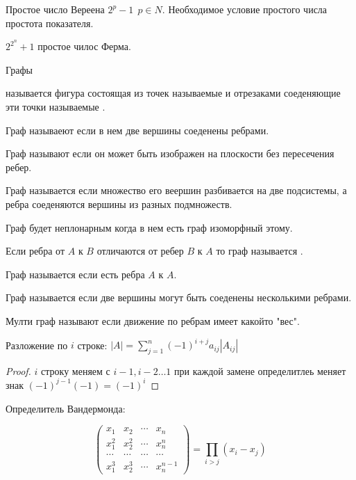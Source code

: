   Простое число Вереена $2^p -1 ~~ p \in N$. Необходимое условие простого числа
простота показателя.

  $2^{2^n} + 1$ простое чилос Ферма.

\begin{title}
  Графы
\end{title}
   называется фигура состоящая из точек называемые 
и отрезаками соеденяющие эти точки называемые .

  Граф называеют  если в нем две вершины соеденены ребрами.

  Граф называют  если он может быть
изображен на плоскости без пересечения ребер.

  Граф называется  если множество его веершин
разбивается на две подсистемы, а ребра соеденяются вершины из разных
подмножеств.

  Граф будет неплонарным когда в нем есть граф изоморфный этому.

  Если ребра от $A$ к $B$ отличаются от ребер $B$ к $A$ то граф называется
.

  Граф называется  если есть ребра $A$ к $A$.

  Граф называется  если две вершины могут быть соеденены
несколькими ребрами.

  Мулти граф называют  если движение по ребрам имеет
какойто "вес".

\begin{theorem}
  Разложение по $i$ строке: $|A| = \sum_{j=1}^n (-1)^{i+j} a_{ij} |A_{ij}|$
\end{theorem}

\begin{proof}
  $i$ строку меняем с $i-1, i-2 \ldots 1$ при каждой замене определитлеь
  меняет знак $(-1)^{j-1} (-1) = (-1)^i$
\end{proof}

\begin{title}
  Определитель Вандермонда:
\end{title}

\begin{displaymath}
  \left(
  \begin{array}{ccccl}
    x_1   & x_2   & \cdots & x_n \\
    x_1^2 & x_2^2 & \cdots & x_n^n\\
    \cdots & \cdots & \cdots & \cdots\\
    x_1^3 & x_2^3 & \cdots & x_n^{n-1}
  \end{array}
  \right)
  = \prod_{i>j}(x_i - x_j)
\end{displaymath}

